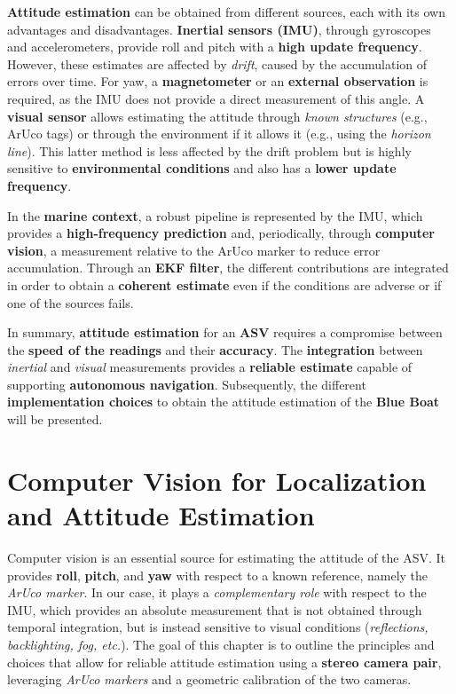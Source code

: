 \textbf{Attitude estimation} can be obtained from different sources, each with its own advantages and disadvantages. \textbf{Inertial sensors (IMU)}\cite{IMU_Euler}, through gyroscopes and accelerometers, provide roll and pitch with a \textbf{high update frequency}. However, these estimates are affected by \textit{drift}, caused by the accumulation of errors over time. For yaw, a \textbf{magnetometer} or an \textbf{external observation} is required, as the IMU does not provide a direct measurement of this angle. A \textbf{visual sensor} allows estimating the attitude through \textit{known structures} (e.g., ArUco tags) or through the environment if it allows it (e.g., using the \textit{horizon line}). This latter method is less affected by the drift problem but is highly sensitive to \textbf{environmental conditions} and also has a \textbf{lower update frequency}.  

In the \textbf{marine context}, a robust pipeline is represented by the IMU, which provides a \textbf{high-frequency prediction} and, periodically, through \textbf{computer vision}, a measurement relative to the ArUco marker to reduce error accumulation. Through an \textbf{EKF filter}\cite{EKS_IMU_cv}, the different contributions are integrated in order to obtain a \textbf{coherent estimate} even if the conditions are adverse or if one of the sources fails.  

In summary, \textbf{attitude estimation} for an \textbf{ASV} requires a compromise between the \textbf{speed of the readings} and their \textbf{accuracy}. The \textbf{integration} between \textit{inertial} and \textit{visual} measurements provides a \textbf{reliable estimate} capable of supporting \textbf{autonomous navigation}. Subsequently, the different \textbf{implementation choices} to obtain the attitude estimation of the \textbf{Blue Boat} will be presented.  

\section{Computer Vision for Localization and Attitude Estimation}

Computer vision is an essential source for estimating the attitude of the ASV. 
It provides \textbf{roll}, \textbf{pitch}, and \textbf{yaw} with respect to a known reference, 
namely the \textit{ArUco marker}. In our case, it plays a \textit{complementary role} with respect to the IMU, 
which provides an absolute measurement that is not obtained through temporal integration, 
but is instead sensitive to visual conditions (\textit{reflections, backlighting, fog, etc.}).
The goal of this chapter is to outline the principles and choices that allow for reliable 
attitude estimation using a \textbf{stereo camera pair}, leveraging \textit{ArUco markers} 
and a geometric calibration of the two cameras.


